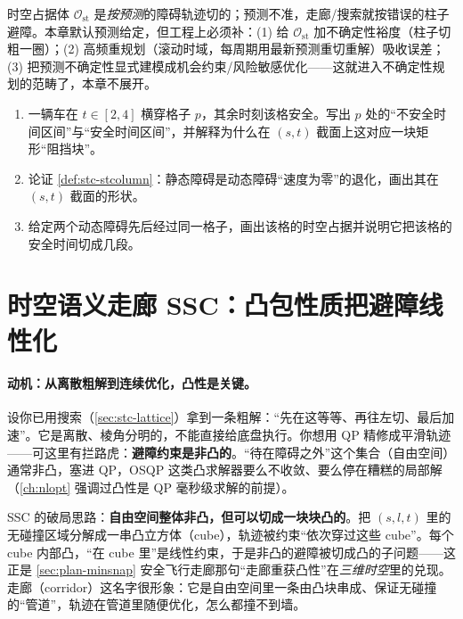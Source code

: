 \begin{pitfall}
时空占据体 $\mathcal{O}_{\mathrm{st}}$ 是\emph{按预测}的障碍轨迹切的；预测不准，走廊/搜索就按错误的柱子避障。本章默认预测给定，但工程上必须补：(1) 给 $\mathcal{O}_{\mathrm{st}}$ 加不确定性裕度（柱子切粗一圈）；(2) 高频重规划（滚动时域，每周期用最新预测重切重解）吸收误差；(3) 把预测不确定性显式建模成机会约束/风险敏感优化——这就进入不确定性规划的范畴了，本章不展开。
\end{pitfall}

\begin{practice}
\begin{enumerate}
  \item 一辆车在 $t\in[2,4]$ 横穿格子 $p$，其余时刻该格安全。写出 $p$ 处的“不安全时间区间”与“安全时间区间”，并解释为什么在 $(s,t)$ 截面上这对应一块矩形“阻挡块”。
  \item 论证 \cref{def:stc-stcolumn}：静态障碍是动态障碍“速度为零”的退化，画出其在 $(s,t)$ 截面的形状。
  \item 给定两个动态障碍先后经过同一格子，画出该格的时空占据并说明它把该格的安全时间切成几段。
\end{enumerate}
\end{practice}

\section{时空语义走廊 SSC：凸包性质把避障线性化}
\label{sec:stc-ssc}

\paragraph{动机：从离散粗解到连续优化，凸性是关键。}
设你已用搜索（\cref{sec:stc-lattice}）拿到一条粗解：“先在这等等、再往左切、最后加速”。它是离散、棱角分明的，不能直接给底盘执行。你想用 QP 精修成平滑轨迹——可这里有拦路虎：\textbf{避障约束是非凸的}。“待在障碍之外”这个集合（自由空间）通常非凸，塞进 QP，OSQP 这类凸求解器要么不收敛、要么停在糟糕的局部解（\cref{ch:nlopt} 强调过凸性是 QP 毫秒级求解的前提）。

SSC 的破局思路：\textbf{自由空间整体非凸，但可以切成一块块凸的}。把 $(s,l,t)$ 里的无碰撞区域分解成一串凸立方体（cube），轨迹被约束“依次穿过这些 cube”。每个 cube 内部凸，“在 cube 里”是线性约束，于是非凸的避障被切成凸的子问题——这正是 \cref{sec:plan-minsnap} 安全飞行走廊那句“走廊重获凸性”在\emph{三维时空}里的兑现。走廊（corridor）这名字很形象：它是自由空间里一条由凸块串成、保证无碰撞的“管道”，轨迹在管道里随便优化，怎么都撞不到墙。

